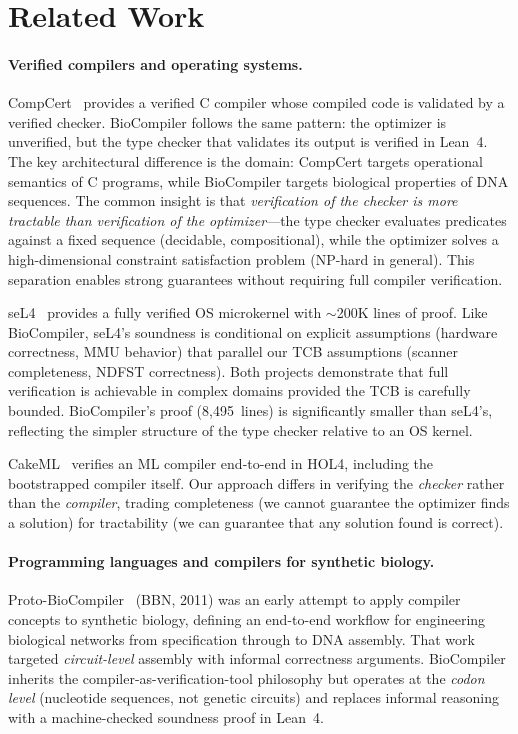 \documentclass[acmsmall,review,anonymous]{acmart}
\begin{document}
\section{Related Work}\label{sec:related}

\paragraph{Verified compilers and operating systems.}
CompCert~\cite{leroy2009compcert} provides a verified C compiler whose
compiled code is validated by a verified checker.  BioCompiler follows
the same pattern: the optimizer is unverified, but the type checker that
validates its output is verified in Lean~4.  The key architectural
difference is the domain: CompCert targets operational semantics of C
programs, while BioCompiler targets biological properties of DNA
sequences.  The common insight is that \emph{verification of the checker
is more tractable than verification of the optimizer}---the type checker
evaluates predicates against a fixed sequence (decidable, compositional),
while the optimizer solves a high-dimensional constraint satisfaction
problem (NP-hard in general).  This separation enables strong guarantees
without requiring full compiler verification.

seL4~\cite{klein2014sel4} provides a fully verified OS microkernel with
$\sim$200K lines of proof.  Like BioCompiler, seL4's soundness is
conditional on explicit assumptions (hardware correctness, MMU behavior)
that parallel our TCB assumptions (scanner completeness, NDFST
correctness).  Both projects demonstrate that full verification is
achievable in complex domains provided the TCB is carefully bounded.
BioCompiler's proof (8,495~lines) is significantly smaller than seL4's,
reflecting the simpler structure of the type checker relative to an OS
kernel.

CakeML~\cite{kumar2014cakeml} verifies an ML compiler end-to-end in
HOL4, including the bootstrapped compiler itself.  Our approach differs
in verifying the \emph{checker} rather than the \emph{compiler}, trading
completeness (we cannot guarantee the optimizer finds a solution) for
tractability (we can guarantee that any solution found is correct).

\paragraph{Programming languages and compilers for synthetic biology.}
Proto-BioCompiler~\cite{beal2011protobiocompiler} (BBN, 2011) was an
early attempt to apply compiler concepts to synthetic biology, defining
an end-to-end workflow for engineering biological networks from
specification through to DNA assembly.  That work targeted
\emph{circuit-level} assembly with informal correctness arguments.
BioCompiler inherits the compiler-as-verification-tool philosophy but
operates at the \emph{codon level} (nucleotide sequences, not genetic
circuits) and replaces informal reasoning with a machine-checked
soundness proof in Lean~4.
\end{document}
